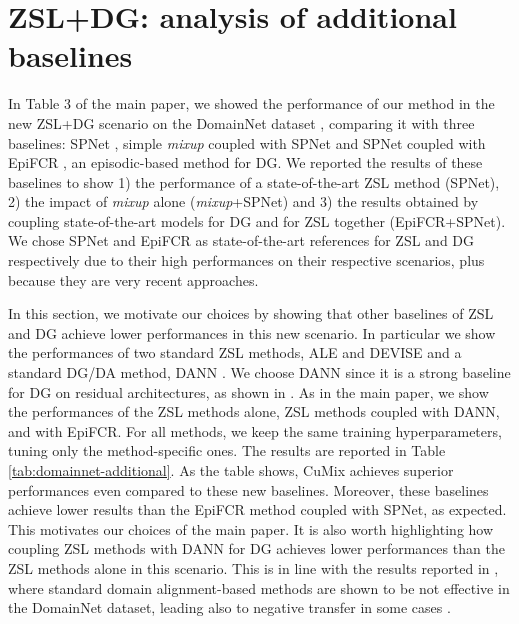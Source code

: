 \documentclass[runningheads]{llncs}
\newcommand{\methodName}{{CuMix} }
\begin{document}
 
\section{ZSL+DG: analysis of additional baselines}
 In Table 3 of the main paper, we showed the performance of our method in the new ZSL+DG scenario on the DomainNet dataset \cite{peng2019moment}, comparing it with three baselines: SPNet \cite{xian2019semantic}, simple \textit{mixup} \cite{zhang2017mixup} coupled with SPNet and SPNet coupled with EpiFCR \cite{li2019episodic}, an episodic-based method for DG. We reported the results of these baselines to show 1) the performance of a state-of-the-art ZSL method (SPNet), 2) the impact of \textit{mixup} alone (\textit{mixup}+SPNet) and 3) the results obtained by coupling state-of-the-art models for DG and for ZSL together (EpiFCR+SPNet). We chose SPNet and EpiFCR as state-of-the-art references for ZSL and DG respectively due to their high performances on their respective scenarios, plus because they are very recent approaches. 

In this section, we motivate our choices by showing that other baselines of ZSL and DG achieve lower performances in this new scenario. In particular we show the performances of two standard ZSL methods, ALE \cite{akata2013label} and DEVISE \cite{frome2013devise} and a standard DG/DA method, DANN \cite{ganin2016domain}. We choose DANN since it is a strong baseline for DG on residual architectures, as shown in \cite{li2019episodic}. As in the main paper, we show the performances of the ZSL methods alone, ZSL methods coupled with DANN, and with EpiFCR. For all methods, we keep the same training hyperparameters, tuning only the method-specific ones. The results are reported in Table \ref{tab:domainnet-additional}. As the table shows, \methodName achieves superior performances even compared to these new baselines. Moreover, these baselines achieve lower results than the EpiFCR method coupled with SPNet, as expected. This motivates our choices of the main paper. It is also worth highlighting how coupling ZSL methods with DANN for DG achieves lower performances than the ZSL methods alone in this scenario. This is in line with the results reported in \cite{peng2019moment}, where standard domain alignment-based methods are shown to be not effective in the DomainNet dataset, leading also to negative transfer in some cases \cite{peng2019moment}.
\end{document}
